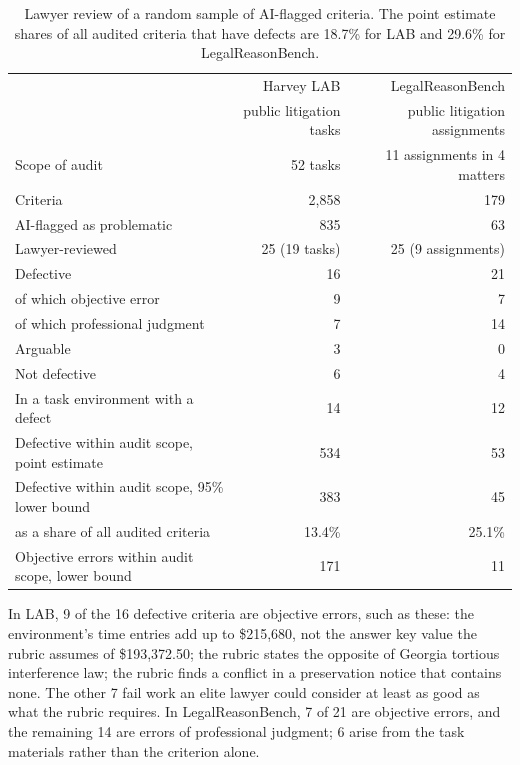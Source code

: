 \documentclass[11pt]{article}
\newcommand{\labTasks}{52}
\newcommand{\labCriteria}{2{,}858}
\newcommand{\labFlagged}{835}
\newcommand{\labSample}{25}
\newcommand{\labSampleTasks}{19}
\newcommand{\labDefective}{16}
\newcommand{\labArguable}{3}
\newcommand{\labNotDefective}{6}
\newcommand{\labObjective}{9}
\newcommand{\labJudgment}{7}
\newcommand{\labEnvItems}{14}
\newcommand{\labDefectiveLB}{383}
\newcommand{\labDefectivePoint}{534}
\newcommand{\labDefectivePointShare}{18.7}
\newcommand{\labDefectiveShare}{13.4}
\newcommand{\labObjectiveLB}{171}
\newcommand{\lrbAssignments}{11}
\newcommand{\lrbCriteria}{179}
\newcommand{\lrbFlagged}{63}
\newcommand{\lrbSample}{25}
\newcommand{\lrbSampleAssignments}{9}
\newcommand{\lrbDefective}{21}
\newcommand{\lrbArguable}{0}
\newcommand{\lrbNotDefective}{4}
\newcommand{\lrbObjective}{7}
\newcommand{\lrbJudgment}{14}
\newcommand{\lrbFromEnv}{6}
\newcommand{\lrbEnvItems}{12}
\newcommand{\lrbDefectiveLB}{45}
\newcommand{\lrbDefectivePoint}{53}
\newcommand{\lrbDefectiveShareLB}{25.1}
\newcommand{\lrbDefectivePointShare}{29.6}
\newcommand{\lrbObjectiveLB}{11}
\begin{document}
\begin{table}[ht]\centering\small
\begin{tabular}{lrr}\toprule
 & Harvey LAB & LegalReasonBench\\
 & public litigation tasks & public litigation assignments\\\midrule
Scope of audit & \labTasks{} tasks & \lrbAssignments{} assignments in 4 matters\\
Criteria & \labCriteria{} & \lrbCriteria{}\\
AI-flagged as problematic & \labFlagged{} & \lrbFlagged{}\\
Lawyer-reviewed & \labSample{} (\labSampleTasks{} tasks) & \lrbSample{} (\lrbSampleAssignments{} assignments)\\
\quad Defective & \labDefective{} & \lrbDefective{}\\
\quad\quad of which objective error & \labObjective{} & \lrbObjective{}\\
\quad\quad of which professional judgment & \labJudgment{} & \lrbJudgment{}\\
\quad Arguable & \labArguable{} & \lrbArguable{}\\
\quad Not defective & \labNotDefective{} & \lrbNotDefective{}\\
In a task environment with a defect & \labEnvItems{} & \lrbEnvItems{}\\
Defective within audit scope, point estimate & \labDefectivePoint{} & \lrbDefectivePoint{}\\
Defective within audit scope, 95\% lower bound & \labDefectiveLB{} & \lrbDefectiveLB{}\\
\quad as a share of all audited criteria & \labDefectiveShare\% & \lrbDefectiveShareLB\%\\
Objective errors within audit scope, lower bound & \labObjectiveLB{} & \lrbObjectiveLB{}\\
\bottomrule\end{tabular}
\caption{Lawyer review of a random sample of AI-flagged criteria. The point estimate shares of all audited criteria that have defects are \labDefectivePointShare\% for LAB and \lrbDefectivePointShare\% for LegalReasonBench.}
\label{tab:main}
\end{table}

In LAB, \labObjective{} of the \labDefective{} defective criteria are objective errors, such as these: the environment's time entries add up to \$215,680, not the answer key value the rubric assumes of \$193,372.50; the rubric states the opposite of Georgia tortious interference law; the rubric finds a conflict in a preservation notice that contains none. The other \labJudgment{} fail work an elite lawyer could consider at least as good as what the rubric requires. In LegalReasonBench, \lrbObjective{} of \lrbDefective{} are objective errors, and the remaining \lrbJudgment{} are errors of professional judgment; \lrbFromEnv{} arise from the task materials rather than the criterion alone.
\end{document}
